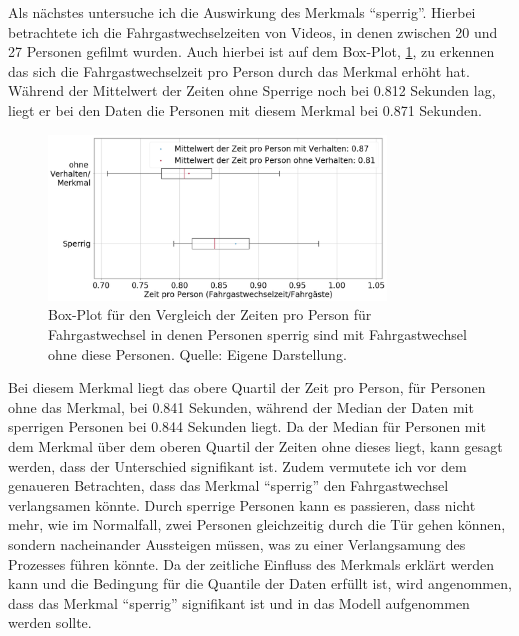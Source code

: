 Als nächstes untersuche ich die Auswirkung des Merkmals "`sperrig"'. Hierbei betrachtete ich die Fahrgastwechselzeiten von Videos, in denen zwischen 20 und 27 Personen gefilmt wurden. Auch hierbei ist auf dem Box-Plot, \figurename \ref{fig:BoxPlotSperrig}, zu erkennen das sich die Fahrgastwechselzeit pro Person durch das Merkmal erhöht hat. Während der Mittelwert der Zeiten ohne Sperrige noch bei 0.812 Sekunden lag, liegt er bei den Daten die Personen mit diesem Merkmal bei 0.871 Sekunden.
\begin{figure}[H]
	\centering
		\includegraphics[width=0.8\textwidth]{pictures/data_evaluation/behavior/comp_Sperrig.png}
	\caption{Box-Plot für den Vergleich der Zeiten pro Person für Fahrgastwechsel in denen Personen sperrig sind mit Fahrgastwechsel ohne diese Personen. Quelle: Eigene Darstellung.}
	\label{fig:BoxPlotSperrig}
\end{figure}
Bei diesem Merkmal liegt das obere Quartil der Zeit pro Person, für Personen ohne das Merkmal, bei 0.841 Sekunden, während der Median der Daten mit sperrigen Personen bei 0.844 Sekunden liegt. Da der Median für Personen mit dem Merkmal über dem oberen Quartil der Zeiten ohne dieses liegt, kann gesagt werden, dass der Unterschied signifikant ist. Zudem vermutete ich vor dem genaueren Betrachten, dass das Merkmal "`sperrig"' den Fahrgastwechsel verlangsamen könnte. Durch sperrige Personen kann es passieren, dass nicht mehr, wie im Normalfall, zwei Personen gleichzeitig durch die Tür gehen können, sondern nacheinander Aussteigen müssen, was zu einer Verlangsamung des Prozesses führen könnte. Da der zeitliche Einfluss des Merkmals erklärt werden kann und die Bedingung für die Quantile der Daten erfüllt ist, wird angenommen, dass das Merkmal "`sperrig"' signifikant ist und in das Modell aufgenommen werden sollte.

